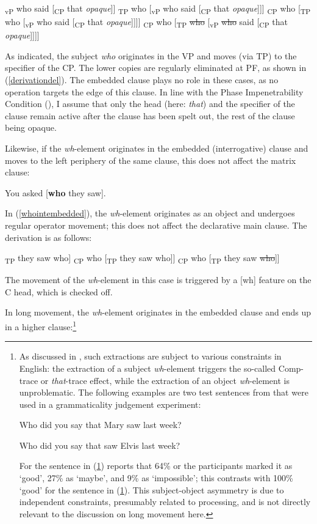 \ea \label{derivation}
\ea {[}\textsubscript{vP} who said [\textsubscript{CP} that \textit{opaque}]]
\ex {[}\textsubscript{TP} who [\textsubscript{vP} who said [\textsubscript{CP} that \textit{opaque}]]]
\ex {[}\textsubscript{CP} who [\textsubscript{TP} who [\textsubscript{vP} who said [\textsubscript{CP} that \textit{opaque}]]]]
\ex {[}\textsubscript{CP} who [\textsubscript{TP} \sout{who} [\textsubscript{vP} \sout{who} said [\textsubscript{CP} that \textit{opaque}]]]] \label{derivationdel}
\z
\z

As indicated, the subject \textit{who} originates in the VP and moves (via TP) to the specifier of the CP. The lower copies are regularly eliminated at PF, as shown in (\ref{derivationdel}). The embedded clause plays no role in these cases, as no operation targets the edge of this clause. In line with the Phase Impenetrability Condition (\citealt{chomsky2000}), I assume that only the head (here: \textit{that}) and the specifier of the clause remain active after the clause has been spelt out, the rest of the clause being opaque.

Likewise, if the \textit{wh}-element originates in the embedded (interrogative) clause and moves to the left periphery of the same clause, this does not affect the matrix clause:

\ea You asked [\textbf{who} they saw]. \label{whointembedded}
\z

In (\ref{whointembedded}), the \textit{wh}-element originates as an object and undergoes regular operator movement; this does not affect the declarative main clause. The derivation is as follows:

\ea \label{derivationwhointembedded}
\ea {[}\textsubscript{TP} they saw who]
\ex {[}\textsubscript{CP} who [\textsubscript{TP} they saw who]]
\ex {[}\textsubscript{CP} who [\textsubscript{TP} they saw \sout{who}]]
\z
\z

The movement of the \textit{wh}-element in this case is triggered by a [wh] feature on the C head, which is checked off.

In long movement, the \textit{wh}-element originates in the embedded clause and ends up in a higher clause:\footnote{As discussed in , such extractions are subject to various constraints in English: the extraction of a subject \textit{wh}-element triggers the so-called Comp-trace or \textit{that}-trace effect, while the extraction of an object \textit{wh}-element is unproblematic. The following examples are two test sentences from \citet[557, ex. 1a and 3a]{sobin2002} that were used in a grammaticality judgement experiment:

\ea Who did you say that Mary saw last week? \label{testthatsubject}
\z

\ea Who did you say that saw Elvis last week? \label{testthatobject}
\z

For the sentence in (\ref{testthatobject}) reports that 64\% or the participants marked it as `good', 27\% as `maybe', and 9\% as `impossible'; this contrasts with 100\% `good' for the sentence in (\ref{testthatsubject}). This subject-object asymmetry is due to independent constraints, presumably related to processing, and is not directly relevant to the discussion on long movement here.}

